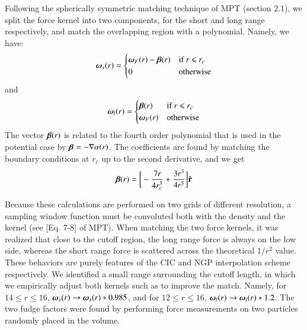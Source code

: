 Following the spherically symmetric matching technique of MPT (section 2.1), 
we split  the force kernel into two components, for the short and long range respectively, and 
match the overlapping region with a polynomial. Namely, we have:
\begin{eqnarray}
\mbox{\boldmath $\omega$}_{s}(r) = \begin{cases} \mbox{\boldmath $\omega$}_{F}(r) -  \mbox{\boldmath $\beta$}(r) &\mbox{if  } \mbox{$r$ $\le$ $r_{c}$ } \\
0 & \mbox{otherwise} 
\end{cases}
\end{eqnarray}
and
\begin{eqnarray}
\mbox{\boldmath $\omega$}_{l}(r) = \begin{cases} \mbox{\boldmath $\beta$}(r) &\mbox{if  } \mbox{$r$ $\le$ $r_{c}$ } \\
 \mbox{\boldmath $\omega$}_{F}(r)  &\mbox{otherwise} 
\end{cases}
\end{eqnarray}
The vector $\mbox{\boldmath $\beta$}(r)$ is related to the fourth order polynomial that is used in the potential case by
 $ \mbox{\boldmath $\beta$} = - {\bf \nabla} \alpha(r)$. The coefficients are found by matching the boundary conditions at $r_{c}$ up to the second derivative,
 and we get
  \begin{eqnarray}
   \mbox{\boldmath $\beta$}(r) = \bigg[ -\frac{7 r}{4 r_{c}^{3}} + \frac{3 r^{3}}{4 r^{5}}\bigg] \hat{\bf r}
  \end{eqnarray}

Because these calculations are performed on two grids of different resolution, a sampling window function must be convoluted 
both with the density and the kernel (see [Eq. 7-8] of MPT).
When matching the two  force kernels, it was realized that close to the cutoff region, the long range force is always on the low side, whereas 
the short range force is scattered across the theoretical $1/r^2$ value. These behaviors are purely features of the CIC and NGP interpolation scheme 
respectively. We identified a small range surrounding the cutoff length, in which we empirically adjust both kernels such as to improve 
the match. Namely, for $14 \le r \le 16$, $\mbox{\boldmath $\omega$}_{s}({r}) \rightarrow \mbox{\boldmath $\omega$}_{s}({ r})*0.985$,
and for  $12 \le r \le 16$, $\mbox{\boldmath $\omega$}_{l}({r}) \rightarrow \mbox{\boldmath $\omega$}_{l}({ r})*1.2$.
The two fudge factors were found by performing force measurements on two particles randomly placed in the volume.

